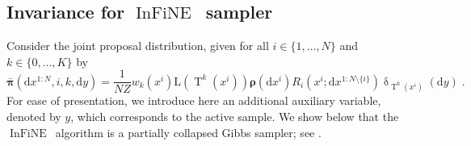 \documentclass{article}
\def\IFIS{\ensuremath{\operatorname{InFiNE}}}
\def\transfo{\operatorname{T}}
\def\rmd{\operatorname{d}\hspace{-2pt}}
\def\rmd{\mathrm{d}}
\def\eqsp{\,}
\def\eqsp{\;}
\newcommand{\1}{\mathds{1}}
\def\w{w}
\newcommand{\chunku}[3]{#1^{#2:#3}}
\newcommand{\chunkum}[4]{#1^{#2:#3 \setminus \{#4\}}}
\def\const{Z}
\def\measpi{\boldsymbol{\pi}}
\def\measprop{\boldsymbol{\rho}}
\def\rmd{\mathrm{d}}
\def\likelihood{\mathrm{L}}
\def\bmeaspi{\bar{\measpi}}
\begin{document}
\subsection{Invariance for \IFIS\ sampler}
\label{subsec:partial-collapsed-infine}
Consider the joint proposal distribution, given for all $i \in \{1,\dots,N\}$ and $k \in \{0,\dots, K\}$ by
\begin{equation}
\label{eq:joint-distribution}
\bmeaspi(\rmd \chunku{x}{1}{N},i,k,\rmd y)= \frac{1}{N \const} \w_k(x^i) \likelihood(\transfo^k(x^i)) \measprop(\rmd x^i) R_i(x^i;\rmd \chunkum{x}{1}{N}{i}) \updelta_{\transfo^k(x^i)} (\rmd y)\eqsp.
\end{equation}
For ease of presentation, we introduce here an additional auxiliary variable, denoted by $y$, which corresponds to the active sample. We show below that the \IFIS\ algorithm is a partially collapsed Gibbs sampler; see \cite{vandyk:park:2008}.
\end{document}
